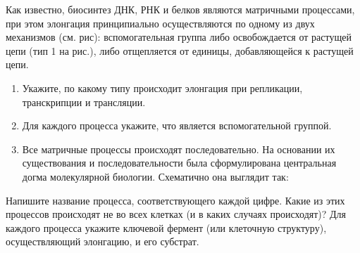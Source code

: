 
Как известно, биосинтез ДНК, РНК и белков являются матричными процессами, при этом элонгация принципиально осуществляются по одному из двух механизмов (см. рис): вспомогательная группа либо освобождается от растущей цепи (тип 1 на рис.), либо отщепляется от единицы, добавляющейся к растущей цепи. 


\begin{enumerate}
    \item Укажите, по какому типу происходит элонгация при репликации, транскрипции и трансляции.
    \item Для каждого процесса укажите, что является вспомогательной группой. 
    \item Все матричные процессы происходят последовательно. На основании их существования и последовательности была сформулирована центральная догма молекулярной биологии. Схематично она выглядит так:
\end{enumerate}

Напишите название процесса, соответствующего каждой цифре. Какие из этих процессов происходят не во всех клетках (и в каких случаях происходят)? Для каждого процесса укажите ключевой фермент (или клеточную структуру), осуществляющий элонгацию, и его субстрат.